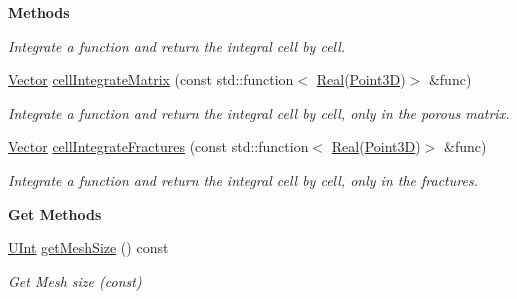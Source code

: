 \begin{Indent}{\bf Methods}
\begin{DoxyCompactItemize}
\begin{DoxyCompactList}\small\item\em Integrate a function and return the integral cell by cell. \end{DoxyCompactList}\item 
\hyperlink{namespaceFVCode3D_a16ccf345652402bccd1a5d2e6782526c}{Vector} \hyperlink{classFVCode3D_1_1Quadrature_ab7900923eb32ae60c817532fba2d3aac}{cell\+Integrate\+Matrix} (const std\+::function$<$ \hyperlink{namespaceFVCode3D_a40c1f5588a248569d80aa5f867080e83}{Real}(\hyperlink{classFVCode3D_1_1Point3D}{Point3D})$>$ \&func)
\begin{DoxyCompactList}\small\item\em Integrate a function and return the integral cell by cell, only in the porous matrix. \end{DoxyCompactList}\item 
\hyperlink{namespaceFVCode3D_a16ccf345652402bccd1a5d2e6782526c}{Vector} \hyperlink{classFVCode3D_1_1Quadrature_a2c3240f24eed6f871394ca3eafbffc78}{cell\+Integrate\+Fractures} (const std\+::function$<$ \hyperlink{namespaceFVCode3D_a40c1f5588a248569d80aa5f867080e83}{Real}(\hyperlink{classFVCode3D_1_1Point3D}{Point3D})$>$ \&func)
\begin{DoxyCompactList}\small\item\em Integrate a function and return the integral cell by cell, only in the fractures. \end{DoxyCompactList}\end{DoxyCompactItemize}
\end{Indent}
\begin{Indent}{\bf Get Methods}\par
\begin{DoxyCompactItemize}
\item 
\hyperlink{namespaceFVCode3D_a4bf7e328c75d0fd504050d040ebe9eda}{U\+Int} \hyperlink{classFVCode3D_1_1Quadrature_a2713fa3182f7a86c1b28f96f85ed68ec}{get\+Mesh\+Size} () const 
\begin{DoxyCompactList}\small\item\em Get Mesh size (const) \end{DoxyCompactList}\end{DoxyCompactItemize}
\end{Indent}

